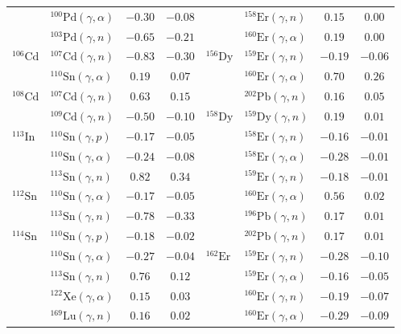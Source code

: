 \begin{table}
\begin{tabular}{llcc|llcc}
    $ $ & $^{100}\mathrm{Pd}(\gamma,\alpha)$ & $-0.30$ & $-0.08$ & $ $ & $^{158}\mathrm{Er}(\gamma,n)$ & $0.15$ & $0.00$ \\ 
    $ $ & $^{103}\mathrm{Pd}(\gamma,n)$ & $-0.65$ & $-0.21$ & $ $ & $^{160}\mathrm{Er}(\gamma,\alpha)$ & $0.19$ & $0.00$ \\ 
    $^{106}\mathrm{Cd}$ & $^{107}\mathrm{Cd}(\gamma,n)$ & $-0.83$ & $-0.30$ & $^{156}\mathrm{Dy}$ & $^{159}\mathrm{Er}(\gamma,n)$ & $-0.19$ & $-0.06$ \\ 
    $ $ & $^{110}\mathrm{Sn}(\gamma,\alpha)$ & $0.19$ & $0.07$ & $ $ & $^{160}\mathrm{Er}(\gamma,\alpha)$ & $0.70$ & $0.26$ \\ 
    $^{108}\mathrm{Cd}$ & $^{107}\mathrm{Cd}(\gamma,n)$ & $0.63$ & $0.15$ & $ $ & $^{202}\mathrm{Pb}(\gamma,n)$ & $0.16$ & $0.05$ \\ 
    $ $ & $^{109}\mathrm{Cd}(\gamma,n)$ & $-0.50$ & $-0.10$ & $^{158}\mathrm{Dy}$ & $^{159}\mathrm{Dy}(\gamma,n)$ & $0.19$ & $0.01$ \\ 
    $^{113}\mathrm{In}$ & $^{110}\mathrm{Sn}(\gamma,p)$ & $-0.17$ & $-0.05$ & $ $ & $^{158}\mathrm{Er}(\gamma,n)$ & $-0.16$ & $-0.01$ \\ 
    $ $ & $^{110}\mathrm{Sn}(\gamma,\alpha)$ & $-0.24$ & $-0.08$ & $ $ & $^{158}\mathrm{Er}(\gamma,\alpha)$ & $-0.28$ & $-0.01$ \\ 
    $ $ & $^{113}\mathrm{Sn}(\gamma,n)$ & $0.82$ & $0.34$ & $ $ & $^{159}\mathrm{Er}(\gamma,n)$ & $-0.18$ & $-0.01$ \\ 
    $^{112}\mathrm{Sn}$ & $^{110}\mathrm{Sn}(\gamma,\alpha)$ & $-0.17$ & $-0.05$ & $ $ & $^{160}\mathrm{Er}(\gamma,\alpha)$ & $0.56$ & $0.02$ \\ 
    $ $ & $^{113}\mathrm{Sn}(\gamma,n)$ & $-0.78$ & $-0.33$ & $ $ & $^{196}\mathrm{Pb}(\gamma,n)$ & $0.17$ & $0.01$ \\ 
    $^{114}\mathrm{Sn}$ & $^{110}\mathrm{Sn}(\gamma,p)$ & $-0.18$ & $-0.02$ & $ $ & $^{202}\mathrm{Pb}(\gamma,n)$ & $0.17$ & $0.01$ \\ 
    $ $ & $^{110}\mathrm{Sn}(\gamma,\alpha)$ & $-0.27$ & $-0.04$ & $^{162}\mathrm{Er}$ & $^{159}\mathrm{Er}(\gamma,n)$ & $-0.28$ & $-0.10$ \\ 
    $ $ & $^{113}\mathrm{Sn}(\gamma,n)$ & $0.76$ & $0.12$ & $ $ & $^{159}\mathrm{Er}(\gamma,\alpha)$ & $-0.16$ & $-0.05$ \\ 
    $ $ & $^{122}\mathrm{Xe}(\gamma,\alpha)$ & $0.15$ & $0.03$ & $ $ & $^{160}\mathrm{Er}(\gamma,n)$ & $-0.19$ & $-0.07$ \\ 
    $ $ & $^{169}\mathrm{Lu}(\gamma,n)$ & $0.16$ & $0.02$ & $ $ & $^{160}\mathrm{Er}(\gamma,\alpha)$ & $-0.29$ & $-0.09$ \\ 

\end{tabular}
\end{table}

